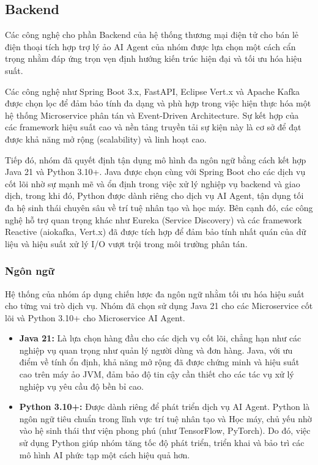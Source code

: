 \subsection{Backend}

Các công nghệ cho phần Backend của hệ thống thương mại điện tử cho bán lẻ điện thoại tích hợp trợ lý ảo AI Agent của nhóm được lựa chọn một cách cẩn trọng nhằm đáp ứng trọn vẹn định hướng kiến trúc hiện đại và tối ưu hóa hiệu suất.  

Các công nghệ như Spring Boot 3.x, FastAPI, Eclipse Vert.x và Apache Kafka được chọn lọc để đảm bảo tính đa dạng và phù hợp trong việc hiện thực hóa một hệ thống Microservice phân tán và Event-Driven Architecture. Sự kết hợp của các framework hiệu suất cao và nền tảng truyền tải sự kiện này là cơ sở để đạt được khả năng mở rộng (scalability) và linh hoạt cao.

Tiếp đó, nhóm đã quyết định tận dụng mô hình đa ngôn ngữ bằng cách kết hợp Java 21 và Python 3.10+. Java được chọn cùng với Spring Boot cho các dịch vụ cốt lõi nhờ sự mạnh mẽ và ổn định trong việc xử lý nghiệp vụ backend và giao dịch, trong khi đó, Python được dành riêng cho dịch vụ AI Agent, tận dụng tối đa hệ sinh thái chuyên sâu về trí tuệ nhân tạo và học máy. Bên cạnh đó, các công nghệ hỗ trợ quan trọng khác như Eureka (Service Discovery) và các framework Reactive (aiokafka, Vert.x) đã được tích hợp để đảm bảo tính nhất quán của dữ liệu và hiệu suất xử lý I/O vượt trội trong môi trường phân tán.

\subsubsection{Ngôn ngữ}
Hệ thống của nhóm áp dụng chiến lược đa ngôn ngữ nhằm tối ưu hóa hiệu suất cho từng vai trò dịch vụ. Nhóm đã chọn sử dụng Java 21 cho các Microservice cốt lõi và Python 3.10+ cho Microservice AI Agent.

\begin{itemize}
    \item \textbf{Java 21:} Là lựa chọn hàng đầu cho các dịch vụ cốt lõi, chẳng hạn như các nghiệp vụ quan trọng như quản lý người dùng và đơn hàng. Java, với ưu điểm về tính ổn định, khả năng mở rộng đã được chứng minh và hiệu suất cao trên máy ảo JVM, đảm bảo độ tin cậy cần thiết cho các tác vụ xử lý nghiệp vụ yêu cầu độ bền bỉ cao. 
    \item \textbf{Python 3.10+: } Được dành riêng để phát triển dịch vụ AI Agent. Python là ngôn ngữ tiêu chuẩn trong lĩnh vực trí tuệ nhân tạo và Học máy, chủ yếu nhờ vào hệ sinh thái thư viện phong phú (như TensorFlow, PyTorch). Do đó, việc sử dụng Python giúp nhóm tăng tốc độ phát triển, triển khai và bảo trì các mô hình AI phức tạp một cách hiệu quả hơn.
\end{itemize}

